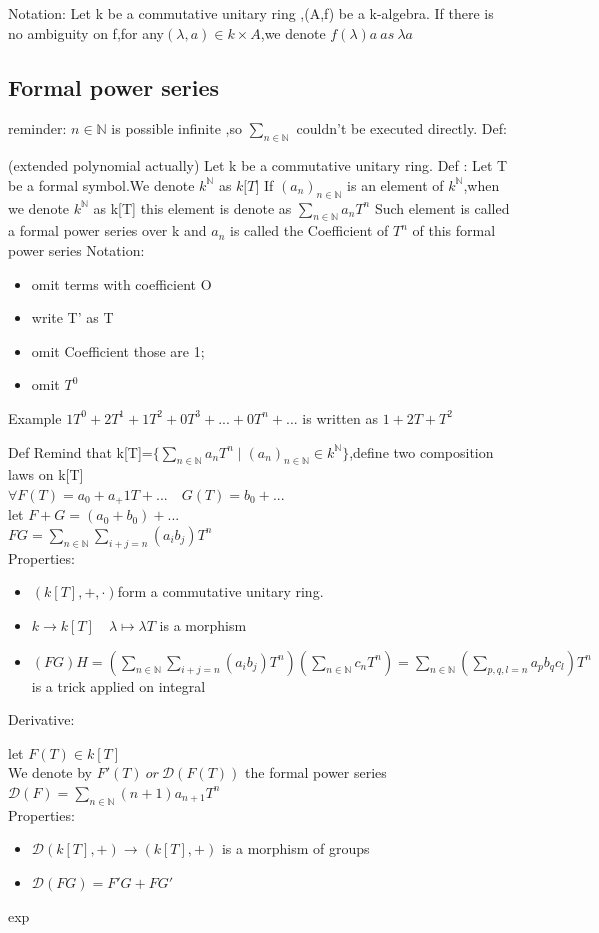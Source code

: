 \documentclass{book}
\begin{document}
Notation: Let k be a commutative unitary ring ,(A,f) be a k-algebra. If there is no ambiguity on f,for any$ (\lambda,a )\in k\times A$,we denote $f(\lambda)a\ as\ \lambda a$
\subsection*{Formal power series}
reminder: $n\in\mathbb{N}$ is possible infinite ,so $\sum\limits_{n\in \mathbb{N}}$ couldn't be executed directly.
Def:

(extended polynomial actually)
Let k be a commutative unitary ring.
Def : Let T be a formal symbol.We denote $k^\mathbb{N}$ as $k\mathbb{[}T\mathbf{]}$ If $(a_n)_{n\in\mathbb{N}}$ is an element of $k^\mathbb{N}$,when we denote $k^\mathbb{N}$ as k[T] this element is denote as $\sum_{n\in\mathbb{N}}a_nT^n$ Such element is called a formal power series over k and $a_n$ is called the Coefficient of $T^n$ of this formal power series
Notation: \begin{itemize}
    \item omit terms with coefficient O
    \item write T' as T
    \item omit Coefficient those are 1;
    \item omit $T^0$
\end{itemize}
Example $1T^0+2T^1+1T^2+0T^3+...+0T^n+...$ is written as $1+2T+T^2$

Def Remind that k[T]=$\{\sum_{n\in\mathbb{N}}a_nT^n\mid (a_n)_{n\in\mathbb{N}}\in k^\mathbb{N} \}$,define two composition laws on k[T]\\
$\forall F(T)=a_0+a_+1T+...\quad G(T)=b_0+...$\\
let $F+G=(a_0+b_0)+...$\\
$FG=\sum\limits_{n\in\mathbb{N}}\sum\limits_{i+j=n}(a_ib_j)T^n$\\
Properties:\begin{itemize}
\item $(k[T],+,\cdot)$form a commutative unitary ring.
\item $k\rightarrow k[T]\quad \lambda\mapsto\lambda T$ is a morphism 
\item $(FG)H=\left(\sum_{n\in\mathbb{N}}^{}\sum\limits_{i+j=n}(a_ib_j)T^n\right)(\sum\limits_{n\in\mathbb{N}}c_nT^n)=\sum\limits_{n\in\mathbb{N}}\left(\sum\limits_{p,q,l=n}a_pb_qc_l\right)T^n$\\is a trick applied on integral
\end{itemize}
Derivative:

let $F(T)\in k[T]$\\
\indent We denote by $F'(T)\ or\ \mathcal{D}(F(T))$ the formal power series\\
\indent$\mathcal{D}(F)=\sum\limits_{n\in\mathbb{N}}(n+1)a_{n+1}T^n$\\
Properties:\begin{itemize}
    \item $\mathcal{D}(k[T],+)\rightarrow(k[T],+)$ is a morphism of groups
    \item $\mathcal{D}(FG)=F'G+FG'$
\end{itemize}
exp
\end{document}
